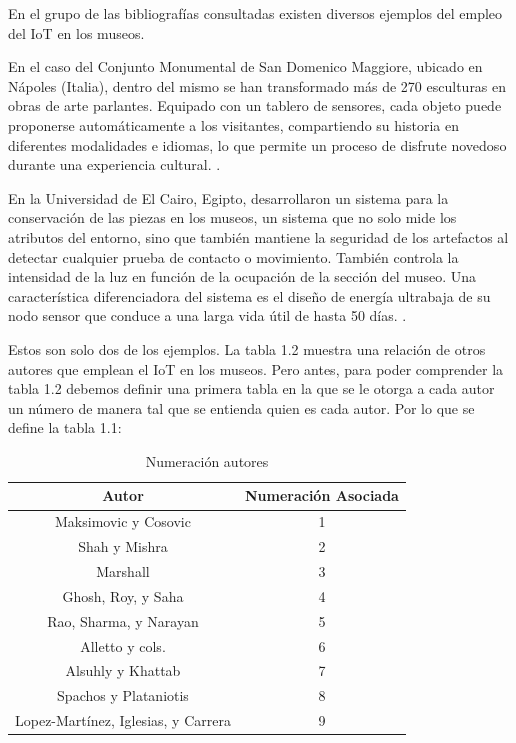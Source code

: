         En el grupo de las bibliografías consultadas existen diversos ejemplos del empleo del IoT en los museos.

        En el caso del Conjunto Monumental de San Domenico Maggiore, ubicado en Nápoles (Italia), dentro del mismo se han transformado más de 270 esculturas en obras de arte parlantes. Equipado con un tablero de sensores, cada objeto puede proponerse automáticamente a los visitantes, compartiendo su historia en diferentes modalidades e idiomas, lo que permite un proceso de disfrute novedoso durante una experiencia cultural. \cite{monumentoSanDomenico}.
    
        En la Universidad de El Cairo, Egipto, desarrollaron un sistema para la conservación de las piezas en los museos, un sistema que no solo mide los atributos del entorno, sino que también mantiene la seguridad de los artefactos al detectar cualquier prueba de contacto o movimiento. También controla la intensidad de la luz en función de la ocupación de la sección del museo. Una característica diferenciadora del sistema es el diseño de energía ultrabaja de su nodo sensor que conduce a una larga vida útil de hasta 50 días. \cite{ultraLowPowerConservacion}.
    
        Estos son solo dos de los ejemplos. La tabla 1.2 muestra una relación de otros autores que emplean el IoT en los museos. Pero antes, para poder comprender la tabla 1.2 debemos definir una primera tabla en la que se le otorga a cada autor un número de manera tal que se entienda quien es cada autor. Por lo que se define la tabla 1.1:

    \begin{table}[h]
        \centering
        \caption{Numeración autores}
        \begin{tabular}{|c|c|}
        \hline
        \rowcolor[HTML]{9698ED} 
        Autor & Numeración Asociada \\ \hline
        Maksimovic y Cosovic \cite{maksimovic}     & 1                   \\ \hline
        Shah y Mishra \cite{shan}     & 2                                \\ \hline
        Marshall \cite{marshall}     & 3                                 \\ \hline
        Ghosh, Roy, y Saha \cite{ghosh}     & 4                          \\ \hline
        Rao, Sharma, y Narayan \cite{rao}     & 5                        \\ \hline
        Alletto y cols. \cite{alletto}     & 6                           \\ \hline
        Alsuhly y Khattab \cite{alsuhly}     & 7                         \\ \hline
        Spachos y Plataniotis \cite{spachos}     & 8                     \\ \hline
        Lopez-Martínez, Iglesias, y Carrera \cite{lopezmartinez}     & 9\\ \hline
        \end{tabular}
        \label{tab:numeracion_autores}
    \end{table}

